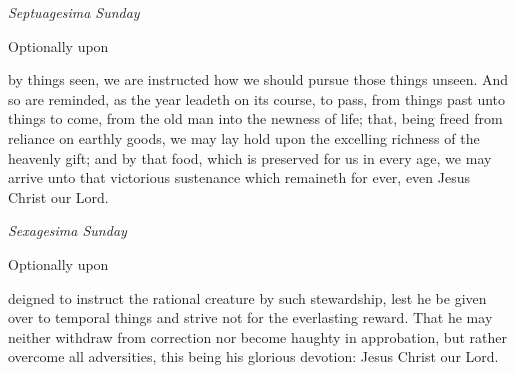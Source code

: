 \begin{multicols}{2}
\centerline{\textit{Septuagesima Sunday}}
\begin{rubric}
	Optionally upon 
\end{rubric}
 by things seen, we are instructed how we should pursue those things unseen. And so are reminded, as the year leadeth on its course, to pass, from things past unto things to come, from the old man into the newness of life; that, being freed from reliance on earthly goods, we may lay hold upon the excelling richness of the heavenly gift; and by that food, which is preserved for us in every age, we may arrive unto that victorious sustenance which remaineth for ever, even Jesus Christ our Lord.\\


\centerline{\textit{Sexagesima Sunday}}
\begin{rubric}
	Optionally upon 
\end{rubric}
 deigned to instruct the rational creature by such stewardship, lest he be given over to temporal things and strive not for the everlasting reward. That he may neither withdraw from correction nor become haughty in approbation, but rather overcome all adversities, this being his glorious devotion: Jesus Christ our Lord.\\



\end{multicols}
